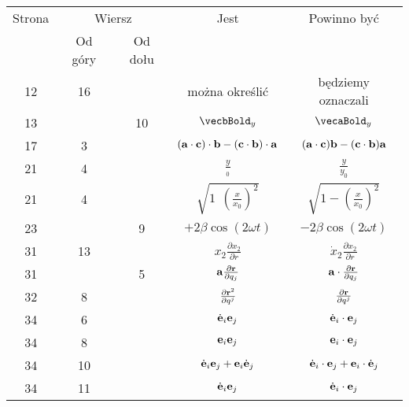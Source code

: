 \documentclass[a4paper,11pt]{article}
\numberwithin{equation}{section}
\begin{document}
\begin{center}

  \begin{tabular}{|c|c|c|c|c|}
    \hline
    Strona & \multicolumn{2}{c|}{Wiersz} & Jest
                              & Powinno być \\ \cline{2-3}
    & Od góry & Od dołu & & \\
    \hline
    12  & 16 & & można określić & będziemy oznaczali \\
    13  & & 10 & $\vecbBold_{ y }$ & $\vecaBold_{ y }$ \\
    17  &  3 & & $( \mathbf{a} \cdot \mathbf{c} ) \cdot \mathbf{b}
                 - ( \mathbf{c} \cdot \mathbf{b} ) \cdot \mathbf{a}$
           & $( \mathbf{a} \cdot \mathbf{c} ) \mathbf{b}
             - ( \mathbf{c} \cdot \mathbf{b} ) \mathbf{a}$ \\
    21  &  4 & & $\frac{ y }{ { }_{ 0 } }$ & $\frac{ y }{ { y }_{ 0 } }$ \\
    21  &  4 & & $\sqrt{ 1 \:\: \left( \frac{ x }{ x_{ 0 } } \right)^{ 2 } }$
           & $\sqrt{ 1 - \left( \frac{ x }{ x_{ 0 } } \right)^{ 2 } } $ \\
    23  & &  9 & $+2\beta \cos( 2\omega t )$ & $-2\beta \cos( 2\omega t )$ \\
    31  & 13 & & $x_{ 2 } \frac{ \partial x_{ 2 } }{ \partial r }$
           & $\dot{ x }_{ 2 } \frac{ \partial x_{ 2 } }{ \partial r }$ \\
    31  & &  5 & $\mathbf{a} \frac{ \partial \mathbf{r} }{ \partial q_{ j } }$
           & $\mathbf{a} \cdot \frac{ \partial \mathbf{r} }{ \partial q_{ j } }$ \\
    32  &  8 & & $\frac{ \partial \mathbf{r}^{ 2 } }{ \partial { q^{ j } } }$
           & $\frac{ \partial \mathbf{r} }{ \partial { q^{ j } } }$ \\
    34  &  6 & & $\dot{ \mathbf{e} }_{ i } \mathbf{e}_{ j }$
           & $\dot{ \mathbf{e} }_{ i } \cdot \mathbf{e}_{ j }$ \\
    34  &  8 & & $\mathbf{e}_{ i } \mathbf{e}_{ j }$
           & $\mathbf{e}_{ i } \cdot \mathbf{e}_{ j }$ \\
    34  & 10 & & $\dot{ \mathbf{e} }_{ i } \mathbf{e}_{ j }
                 + \mathbf{e}_{ i } \dot{ \mathbf{e} }_{ j }$
           & $\dot{ \mathbf{e} }_{ i } \cdot \mathbf{e}_{ j }
             + \mathbf{e}_{ i } \cdot \dot{ \mathbf{e} }_{ j }$ \\
    34  & 11 & & $\dot{ \mathbf{e} }_{ i } \mathbf{e}_{ j }$
           & $\dot{ \mathbf{e} }_{ i } \cdot \mathbf{e}_{ j }$ \\

\end{tabular}
\end{center}
\end{document}
